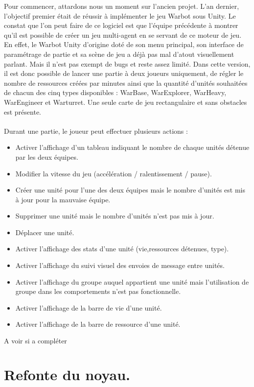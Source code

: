 \documentclass{report}
\begin{document}
Pour commencer, attardons nous un moment sur l'ancien projet. L'an dernier, l'objectif premier était de réussir à implémenter le jeu Warbot sous Unity. Le constat que l'on peut faire de ce logiciel est que l'équipe précédente à montrer qu'il est possible de créer un jeu multi-agent en se servant de ce moteur de jeu.
En effet, le Warbot Unity d'origine doté de son menu principal, son interface de paramétrage de partie et sa scène de jeu a déjà pas mal d'atout visuellement parlant. Mais il n'est pas exempt de bugs et reste assez limité.
Dans cette version, il est donc possible de lancer une partie à deux joueurs uniquement, de régler le nombre de ressources créées par minutes ainsi que la quantité d'unités souhaitées de chacun des cinq types disponibles : WarBase, WarExplorer, WarHeavy, WarEngineer et Warturret. Une seule carte de jeu rectangulaire et sans obstacles est présente. 

\paragraph{}Durant une partie, le joueur peut effectuer plusieurs actions :
\begin{itemize}
\item Activer l'affichage d'un tableau indiquant le nombre de chaque unités détenue par les deux équipes.
\item Modifier la vitesse du jeu (accélération / ralentissement / pause).
\item Créer une unité pour l'une des deux équipes mais le nombre d'unités est mis à jour pour la mauvaise équipe.
\item Supprimer une unité mais le nombre d'unités n'est pas mis à jour.
\item Déplacer une unité.
\item Activer l'affichage des stats d'une unité (vie,ressources détenues, type).
\item Activer l'affichage du suivi visuel des envoies de message entre unités.
\item Activer l'affichage du groupe auquel appartient une unité mais l'utilisation de groupe dans les comportements n'est pas fonctionnelle.
\item Activer l'affichage de la barre de vie d'une unité.
\item Activer l'affichage de la barre de ressource d'une unité.
\end{itemize}

A voir si a compléter

\section{Refonte du noyau.}
\end{document}
